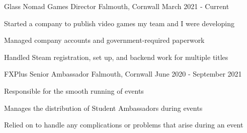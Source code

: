 

\begin{cventries}
    \cventry
        {Glass Nomad Games}
        {Director}
        {Falmouth, Cornwall}
        {March 2021 - Current}
        {
            \begin{cvitems}
                \item Started a company to publish video games my team and I were developing
                \item Managed company accounts and government-required paperwork
                \item Handled Steam registration, set up, and backend work for multiple titles
            \end{cvitems}
        }


    \cventry
        {FXPlus}
        {Senior Ambassador}
        {Falmouth, Cornwall}
        {June 2020 - September 2021}
        {
            \begin{cvitems}
                \item Responsible for the smooth running of events
                \item Manages the distribution of Student Ambassadors during events
                \item Relied on to handle any complications or problems that arise during an event
            \end{cvitems}
        }


\end{cventries}
